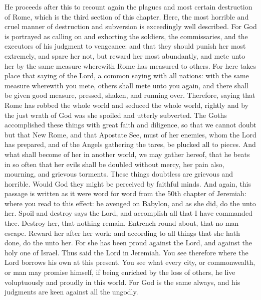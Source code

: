 He proceeds after this to recount again the plagues and most certain destruction of Rome, which is the third section of this chapter. Here, the most horrible and cruel manner of destruction and subversion is exceedingly well described. For God is portrayed as calling on and exhorting the soldiers, the commissaries, and the executors of his judgment to vengeance: and that they should punish her most extremely, and spare her not, but reward her most abundantly, and mete unto her by the same measure wherewith Rome has measured to others. For here takes place that saying of the Lord, a common saying with all nations: with the same measure wherewith you mete, others shall mete unto you again, and there shall be given good measure, pressed, shaken, and running over. Therefore, saying that Rome has robbed the whole world and seduced the whole world, rightly and by the just wrath of God was she spoiled and utterly subverted. The Goths accomplished these things with great faith and diligence, so that we cannot doubt but that New Rome, and that Apostate See, must of her enemies, whom the Lord has prepared, and of the Angels gathering the tares, be plucked all to pieces. And what shall become of her in another world, we may gather hereof, that he beats in so often that her evils shall be doubled without mercy, her pain also, mourning, and grievous torments. These things doubtless are grievous and horrible. Would God they might be perceived by faithful minds. And again, this passage is written as it were word for word from the 50th chapter of Jeremiah: where you read to this effect: be avenged on Babylon, and as she did, do the unto her. Spoil and destroy says the Lord, and accomplish all that I have commanded thee. Destroy her, that nothing remain. Entrench round about, that no man escape. Reward her after her work: and according to all things that she hath done, do the unto her. For she has been proud against the Lord, and against the holy one of Israel. Thus said the Lord in Jeremiah. You see therefore where the Lord borrows his own at this present. You see what every city, or commonwealth, or man may promise himself, if being enriched by the loss of others, he live voluptuously and proudly in this world. For God is the same always, and his judgments are keen against all the ungodly.

